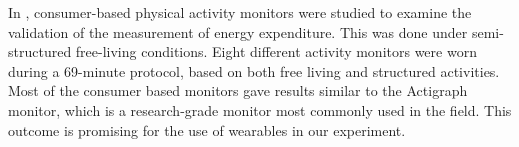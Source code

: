 In \cite{lee2013validity}, consumer-based physical activity monitors were studied to examine the validation of the measurement of energy expenditure.
This was done under semi-structured free-living conditions. 
Eight different activity monitors were worn during a 69-minute protocol, based on both free living and structured activities. 
Most of the consumer based monitors gave results similar to the Actigraph monitor, which is a research-grade monitor most commonly used in the field. 
This outcome is promising for the use of wearables in our experiment.